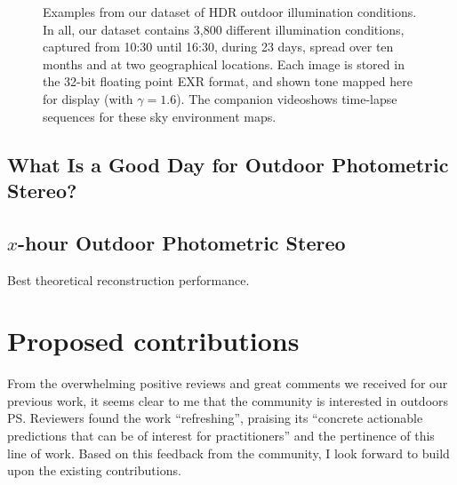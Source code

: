 \documentclass{report}
\begin{document}
\begin{figure}[!th]
\begin{tabular}{@{}rcccccccccccc@{}}
    \\

    \end{tabular}
   	\caption[]{Examples from our dataset of HDR outdoor illumination conditions. In all, our dataset contains 3,800 different illumination conditions, captured from 10:30 until 16:30, during 23 days, spread over ten months and at two geographical locations. Each image is stored in the 32-bit floating point EXR format, and shown tone mapped here for display (with $\gamma = 1.6$). The companion video\footnotemark shows time-lapse sequences for these sky environment maps.}
	\label{fig:database}
\end{figure}

\section{What Is a Good Day for Outdoor Photometric Stereo?}
\label{iccp15}

%

\section{$x$-hour Outdoor Photometric Stereo}
\label{3dv15}

Best theoretical reconstruction performance.
%




\chapter{Proposed contributions}


From the overwhelming positive reviews and great comments we received for our previous work, it seems clear to me that the community is interested in outdoors PS. Reviewers found the work ``refreshing'', praising its ``concrete actionable predictions that can be of interest for practitioners'' and the pertinence of this line of work. Based on this feedback from the community, I look forward to build upon the existing contributions.
\end{document}
